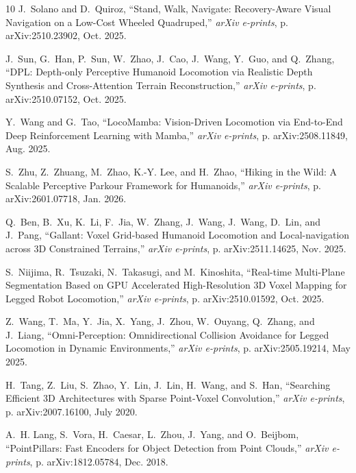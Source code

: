 \documentclass[letterpaper, 10 pt, conference]{ieeeconf/ieeeconf}
\begin{document}
\begin{thebibliography}{10}
J.~{Solano} and D.~{Quiroz}, ``{Stand, Walk, Navigate: Recovery-Aware Visual
  Navigation on a Low-Cost Wheeled Quadruped},'' \emph{arXiv e-prints}, p.
  arXiv:2510.23902, Oct. 2025.

J.~{Sun}, G.~{Han}, P.~{Sun}, W.~{Zhao}, J.~{Cao}, J.~{Wang}, Y.~{Guo}, and
  Q.~{Zhang}, ``{DPL: Depth-only Perceptive Humanoid Locomotion via Realistic
  Depth Synthesis and Cross-Attention Terrain Reconstruction},'' \emph{arXiv
  e-prints}, p. arXiv:2510.07152, Oct. 2025.

Y.~{Wang} and G.~{Tao}, ``{LocoMamba: Vision-Driven Locomotion via End-to-End
  Deep Reinforcement Learning with Mamba},'' \emph{arXiv e-prints}, p.
  arXiv:2508.11849, Aug. 2025.

S.~{Zhu}, Z.~{Zhuang}, M.~{Zhao}, K.-Y. {Lee}, and H.~{Zhao}, ``{Hiking in the
  Wild: A Scalable Perceptive Parkour Framework for Humanoids},'' \emph{arXiv
  e-prints}, p. arXiv:2601.07718, Jan. 2026.

Q.~{Ben}, B.~{Xu}, K.~{Li}, F.~{Jia}, W.~{Zhang}, J.~{Wang}, J.~{Wang},
  D.~{Lin}, and J.~{Pang}, ``{Gallant: Voxel Grid-based Humanoid Locomotion and
  Local-navigation across 3D Constrained Terrains},'' \emph{arXiv e-prints}, p.
  arXiv:2511.14625, Nov. 2025.

S.~{Niijima}, R.~{Tsuzaki}, N.~{Takasugi}, and M.~{Kinoshita}, ``{Real-time
  Multi-Plane Segmentation Based on GPU Accelerated High-Resolution 3D Voxel
  Mapping for Legged Robot Locomotion},'' \emph{arXiv e-prints}, p.
  arXiv:2510.01592, Oct. 2025.

Z.~{Wang}, T.~{Ma}, Y.~{Jia}, X.~{Yang}, J.~{Zhou}, W.~{Ouyang}, Q.~{Zhang},
  and J.~{Liang}, ``{Omni-Perception: Omnidirectional Collision Avoidance for
  Legged Locomotion in Dynamic Environments},'' \emph{arXiv e-prints}, p.
  arXiv:2505.19214, May 2025.

H.~{Tang}, Z.~{Liu}, S.~{Zhao}, Y.~{Lin}, J.~{Lin}, H.~{Wang}, and S.~{Han},
  ``{Searching Efficient 3D Architectures with Sparse Point-Voxel
  Convolution},'' \emph{arXiv e-prints}, p. arXiv:2007.16100, July 2020.

A.~H. {Lang}, S.~{Vora}, H.~{Caesar}, L.~{Zhou}, J.~{Yang}, and O.~{Beijbom},
  ``{PointPillars: Fast Encoders for Object Detection from Point Clouds},''
  \emph{arXiv e-prints}, p. arXiv:1812.05784, Dec. 2018.


\end{thebibliography}
\end{document}
